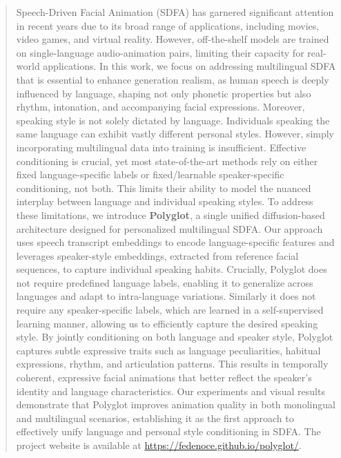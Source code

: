 \documentclass[a4paper, 10pt, conference]{ieeeconf}      %
\begin{document}
\begin{abstract}
Speech-Driven Facial Animation (SDFA) has garnered significant attention in recent years due to its broad range of applications, including movies, video games, and virtual reality. However, off-the-shelf models are trained on single-language audio-animation pairs, limiting their capacity for real-world applications. In this work, we focus on addressing multilingual SDFA that is essential to enhance generation realism, as human speech is deeply influenced by language, shaping not only phonetic properties but also rhythm, intonation, and accompanying facial expressions. Moreover, speaking style is not solely dictated by language. Individuals speaking the same language can exhibit vastly different personal styles. However, simply incorporating multilingual data into training is insufficient. Effective conditioning is crucial, yet most state-of-the-art methods rely on either fixed language-specific labels or fixed/learnable speaker-specific conditioning, not both. This limits their ability to model the nuanced interplay between language and individual speaking styles. To address these limitations, we introduce \textbf{Polyglot}, a single unified diffusion-based architecture designed for personalized multilingual SDFA. Our approach uses speech transcript embeddings to encode language-specific features and leverages speaker-style embeddings, extracted from reference facial sequences, to capture individual speaking habits. Crucially, Polyglot does not require predefined language labels, enabling it to generalize across languages and adapt to intra-language variations. Similarly it does not require any speaker-specific labels, which are learned in a self-supervised learning manner, allowing us to efficiently capture the desired speaking style. By jointly conditioning on both language and speaker style, Polyglot captures subtle expressive traits such as language peculiarities, habitual expressions, rhythm, and articulation patterns. This results in temporally coherent, expressive facial animations that better reflect the speaker’s identity and language characteristics. Our experiments and visual results demonstrate that Polyglot improves animation quality in both monolingual and multilingual scenarios, establishing it as the first approach to effectively unify language and personal style conditioning in SDFA. 
The project website is available at \href{https://fedenoce.github.io/polyglot/}{https://fedenoce.github.io/polyglot/}.
\end{abstract}
\end{document}
